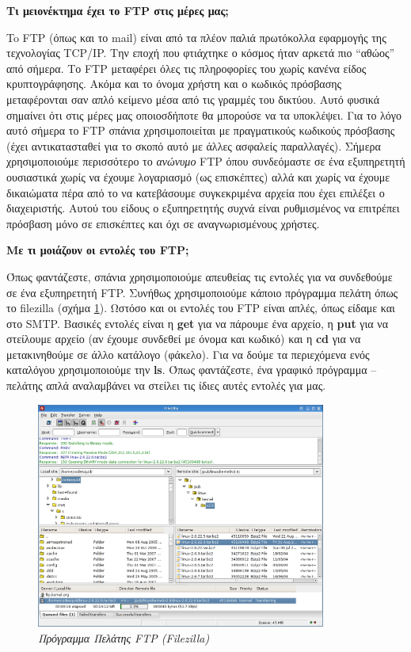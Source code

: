 \begin{inthebox}
\textbf{Τι μειονέκτημα έχει το FTP στις μέρες μας;}

To FTP (όπως και το mail) είναι  από τα πλέον παλιά πρωτόκολλα εφαρμογής της τεχνολογίας TCP/IP. Την εποχή που φτιάχτηκε ο κόσμος ήταν αρκετά πιο ``αθώος'' από σήμερα. Το FTP μεταφέρει όλες τις πληροφορίες του χωρίς κανένα είδος κρυπτογράφησης. Ακόμα και το όνομα χρήστη και ο κωδικός πρόσβασης μεταφέρονται σαν απλό κείμενο μέσα από τις γραμμές του δικτύου. Αυτό φυσικά σημαίνει ότι στις μέρες μας οποιοσδήποτε θα μπορούσε να τα υποκλέψει. Για το λόγο αυτό σήμερα το FTP σπάνια χρησιμοποιείται με πραγματικούς κωδικούς πρόσβασης (έχει αντικατασταθεί για το σκοπό αυτό με άλλες ασφαλείς παραλλαγές). Σήμερα χρησιμοποιούμε περισσότερο το \emph{ανώνυμο} FTP όπου συνδεόμαστε σε ένα εξυπηρετητή ουσιαστικά χωρίς να έχουμε λογαριασμό (ως επισκέπτες) αλλά και χωρίς να έχουμε δικαιώματα πέρα από το να κατεβάσουμε συγκεκριμένα αρχεία που έχει επιλέξει ο διαχειριστής. Αυτού του είδους ο εξυπηρετητής συχνά είναι ρυθμισμένος να επιτρέπει πρόσβαση μόνο σε επισκέπτες και όχι σε αναγνωρισμένους χρήστες. 

\textbf{Με τι μοιάζουν οι εντολές του FTP;}

Όπως φαντάζεστε, σπάνια χρησιμοποιούμε απευθείας τις εντολές για να συνδεθούμε σε ένα εξυπηρετητή FTP. Συνήθως χρησιμοποιούμε κάποιο πρόγραμμα πελάτη όπως το filezilla (σχήμα \ref{6-9}). Ωστόσο και οι εντολές του FTP είναι απλές, όπως είδαμε και στο SMTP. Βασικές εντολές είναι η \textbf{get} για να πάρουμε ένα αρχείο, η \textbf{put} για να στείλουμε αρχείο (αν έχουμε συνδεθεί με όνομα και κωδικό) και η \textbf{cd} για να μετακινηθούμε σε άλλο κατάλογο (φάκελο). Για να δούμε τα περιεχόμενα ενός καταλόγου χρησιμοποιούμε την \textbf{ls}. Όπως φαντάζεστε, ένα γραφικό πρόγραμμα -- πελάτης απλά αναλαμβάνει να στείλει τις ίδιες αυτές εντολές για μας.\\
\end{inthebox}

\begin{figure}[!ht]
 \centering
 \includegraphics[width=0.85\textwidth]{images/chapter6/6-9}
 \caption {\textsl{Πρόγραμμα Πελάτης FTP (Filezilla)}}
 \label{6-9}
\end{figure}

